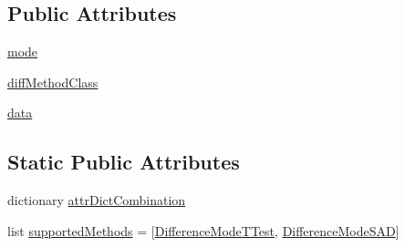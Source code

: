\subsection*{Public Attributes}
\begin{DoxyCompactItemize}
\item 
\hyperlink{classsoftware_1_1chipwhisperer_1_1analyzer_1_1utils_1_1TraceExplorerScripts_1_1PartitionDisplay_1_1DifferenceMode_a877d514ea60f264b7e82f6077d12d67a}{mode}
\item 
\hyperlink{classsoftware_1_1chipwhisperer_1_1analyzer_1_1utils_1_1TraceExplorerScripts_1_1PartitionDisplay_1_1DifferenceMode_a5557d2380c22894d9ea79813b4581cd7}{diff\+Method\+Class}
\item 
\hyperlink{classsoftware_1_1chipwhisperer_1_1analyzer_1_1utils_1_1TraceExplorerScripts_1_1PartitionDisplay_1_1DifferenceMode_a9a04438b710bd74ede752e9a0b700b6d}{data}
\end{DoxyCompactItemize}
\subsection*{Static Public Attributes}
\begin{DoxyCompactItemize}
\item 
dictionary \hyperlink{classsoftware_1_1chipwhisperer_1_1analyzer_1_1utils_1_1TraceExplorerScripts_1_1PartitionDisplay_1_1DifferenceMode_a3316d0eb98412ff5aae5d04390025c9f}{attr\+Dict\+Combination}
\item 
list \hyperlink{classsoftware_1_1chipwhisperer_1_1analyzer_1_1utils_1_1TraceExplorerScripts_1_1PartitionDisplay_1_1DifferenceMode_aa24e373af45fdb2612ffb68849cecca4}{supported\+Methods} = \mbox{[}\hyperlink{classsoftware_1_1chipwhisperer_1_1analyzer_1_1utils_1_1TraceExplorerScripts_1_1PartitionDisplay_1_1DifferenceModeTTest}{Difference\+Mode\+T\+Test}, \hyperlink{classsoftware_1_1chipwhisperer_1_1analyzer_1_1utils_1_1TraceExplorerScripts_1_1PartitionDisplay_1_1DifferenceModeSAD}{Difference\+Mode\+S\+A\+D}\mbox{]}
\end{DoxyCompactItemize}


